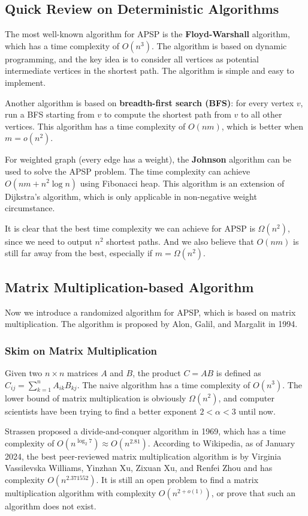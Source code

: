 \documentclass[12pt]{article}
\begin{document}
\subsection{Quick Review on Deterministic Algorithms}

The most well-known algorithm for APSP is the \textbf{Floyd-Warshall} algorithm, which has a time complexity of $O(n^3)$. The algorithm is based on dynamic programming, and the key idea is to consider all vertices as potential intermediate vertices in the shortest path. The algorithm is simple and easy to implement.

Another algorithm is based on \textbf{breadth-first search (BFS)}: for every vertex $v$, run a BFS starting from $v$ to compute the shortest path from $v$ to all other vertices. This algorithm has a time complexity of $O(nm)$, which is better when $m=o(n^2)$.

For weighted graph (every edge has a weight), the \textbf{Johnson} algorithm can be used to solve the APSP problem. The time complexity can achieve $O(nm+n^2\log n)$ using Fibonacci heap. This algorithm is an extension of Dijkstra's algorithm, which is only applicable in non-negative weight circumstance. 

It is clear that the best time complexity we can achieve for APSP is $\Omega(n^2)$, since we need to output $n^2$ shortest paths. And we also believe that $O(nm)$ is still far away from the best, especially if $m=\Omega(n^2)$.

\subsection{Matrix Multiplication-based Algorithm}

Now we introduce a randomized algorithm for APSP, which is based on matrix multiplication. The algorithm is proposed by Alon, Galil, and Margalit in 1994.

\subsubsection{Skim on Matrix Multiplication}

Given two $n\times n$ matrices $A$ and $B$, the product $C=AB$ is defined as $C_{ij}=\sum_{k=1}^n A_{ik}B_{kj}$. The naive algorithm has a time complexity of $O(n^3)$. The lower bound of matrix multiplication is obviously $\Omega(n^2)$, and computer scientists have been trying to find a better exponent $2<\alpha<3$ until now.

Strassen proposed a divide-and-conquer algorithm in 1969, which has a time complexity of $O(n^{\log_2 7})\approx O(n^{2.81})$. According to Wikipedia, as of January 2024, the best peer-reviewed matrix multiplication algorithm is by Virginia Vassilevska Williams, Yinzhan Xu, Zixuan Xu, and Renfei Zhou and has complexity $O(n^{2.371552})$. It is still an open problem to find a matrix multiplication algorithm with complexity $O(n^{2+o(1)})$, or prove that such an algorithm does not exist.
\end{document}
